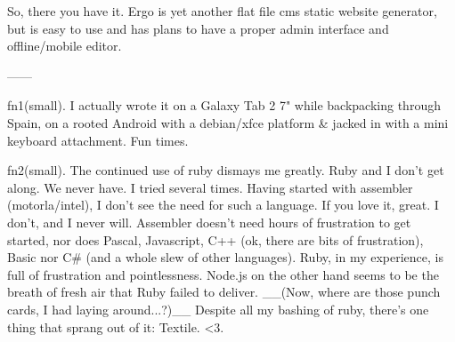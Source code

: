 So, there you have it. Ergo is yet another flat file cms static website generator, but is easy to use and has plans to have a proper admin interface and offline/mobile editor.

------

fn1(small). I actually wrote it on a Galaxy Tab 2 7" while backpacking through Spain, on a rooted Android with a debian/xfce platform & jacked in with a mini keyboard attachment. Fun times.

fn2(small).  The continued use of ruby dismays me greatly. Ruby and I don't get along. We never have. I tried several times. Having started with assembler (motorla/intel), I don't see the need for such a language. If you love it, great. I don't, and I never will. Assembler doesn't need hours of frustration to get started, nor does Pascal, Javascript, C++ (ok, there are bits of frustration), Basic nor C# (and a whole slew of other languages). Ruby, in my experience, is full of frustration and pointlessness. Node.js on the other hand seems to be the breath of fresh air that Ruby failed to deliver. __(Now, where are those punch cards, I had laying around...?)__ Despite all my bashing of ruby, there's one thing that sprang out of it: Textile. <3.



